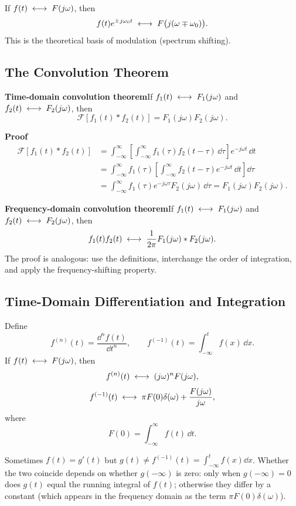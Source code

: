 If $f(t)\;\longleftrightarrow\; F(j\omega)$, then
\[
    f(t)e^{\pm j\omega_0 t}\;\longleftrightarrow\; F\bigl(j(\omega\mp\omega_0)\bigr).
\]
This is the theoretical basis of modulation (spectrum shifting).

\subsection{The Convolution Theorem}

\textbf{Time-domain convolution theorem}\quad If
$f_1(t)\;\longleftrightarrow\; F_1(j\omega)$ and $f_2(t)\;\longleftrightarrow\; F_2(j\omega)$, then
\[
    \mathcal{F}[f_1(t)*f_2(t)]=F_1(j\omega)F_2(j\omega).
\]

\begin{note}
\textbf{Proof}\quad
\[
\begin{aligned}
    \mathcal{F}[f_1(t)*f_2(t)]
    &=\int_{-\infty}^{\infty}\left[\int_{-\infty}^{\infty}f_1(\tau)f_2(t-\tau)\,\dd\tau\right]
      e^{-j\omega t}\,\dd t\\
    &=\int_{-\infty}^{\infty}f_1(\tau)
      \left[\int_{-\infty}^{\infty}f_2(t-\tau)e^{-j\omega t}\,\dd t\right]\dd\tau\\
    &=\int_{-\infty}^{\infty}f_1(\tau)e^{-j\omega\tau}F_2(j\omega)\,\dd\tau
      =F_1(j\omega)F_2(j\omega).
\end{aligned}
\]
\end{note}

\textbf{Frequency-domain convolution theorem}\quad If
$f_1(t)\;\longleftrightarrow\; F_1(j\omega)$ and $f_2(t)\;\longleftrightarrow\; F_2(j\omega)$, then
\[
    f_1(t)f_2(t)\;\longleftrightarrow\;\frac{1}{2\pi}F_1(j\omega)*F_2(j\omega).
\]
The proof is analogous: use the definitions, interchange the order of
integration, and apply the frequency-shifting property.

\subsection{Time-Domain Differentiation and Integration}

Define
\[
    f^{(n)}(t)=\frac{\dd^{n}f(t)}{\dd t^{n}},\qquad
    f^{(-1)}(t)=\int_{-\infty}^{t}f(x)\,\dd x .
\]
If $f(t)\;\longleftrightarrow\; F(j\omega)$, then
\[
    f^{(n)}(t)\;\longleftrightarrow\;(j\omega)^{n}F(j\omega),
\]
\[
    f^{(-1)}(t)\;\longleftrightarrow\;\pi F(0)\delta(\omega)+\frac{F(j\omega)}{j\omega},
\]
where
\[
    F(0)=\int_{-\infty}^{\infty}f(t)\,\dd t .
\]

\begin{note}
Sometimes $f(t)=g'(t)$ but
$g(t)\neq f^{(-1)}(t)=\displaystyle\int_{-\infty}^{t}f(x)\dd x$. Whether the
two coincide depends on whether $g(-\infty)$ is zero: only when
$g(-\infty)=0$ does $g(t)$ equal the running integral of $f(t)$; otherwise
they differ by a constant (which appears in the frequency domain as the term
$\pi F(0)\delta(\omega)$).
\end{note}

